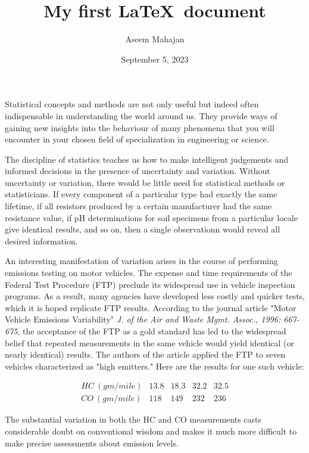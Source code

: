\documentclass{article}
\title{My first \LaTeX \ document}
\author{Aseem Mahajan}
\date{September 5, 2023}
\begin{document}
\maketitle

Statistical concepts and methods are not only useful but indeed often indispensable in understanding the world around us. They provide ways of gaining new insights into the behaviour of many phenomena that you will encounter in your chosen field of specialization in engineering or science.

The discipline of statistics teaches us how to make intelligent judgements and informed decisions in the presence of uncertainty and variation. Without uncertainty or variation, there would be little need for statistical methods or statisticians. If every component of a particular type had exactly the same lifetime, if all resistors produced by a certain manufacturer had the same resistance value, if pH determinations for soil specimens from a particular locale give identical results, and so on, then a single observationn would reveal all desired information.

An interesting manifestation of variation arises in the course of performing emissions testing on motor vehicles. The expense and time requirements of the Federal Test Procedure (FTP) preclude its widespread use in vehicle inspection programs. As a result, many agencies have developed less costly and quicker tests, which it is hoped replicate FTP results. According to the journal article "Motor Vehicle Emissions Variability" \emph{J. of the Air and Waste Mgmt. Assoc., 1996: 667-675}, the acceptance of the FTP as a gold standard has led to the widespread belief that repeated measurements in the same vehicle would yield identical (or nearly identical) results. The authors of the article applied the FTP to seven vehicles characterized as "high emitters." Here are the results for one such vehicle:
\begin{center}\[
    \begin{array}{ccccc}
         HC \ (gm/mile) & 13.8 & 18.3 & 32.2 & 32.5\\
         CO \ (gm/mile) & 118 & 149 & 232 & 236
    \end{array}\]
\end{center}

The substantial variation in both the HC and CO measurements casts considerable doubt on conventional wisdom and makes it much more difficult to make precise assessments about emission levels.
\end{document}
